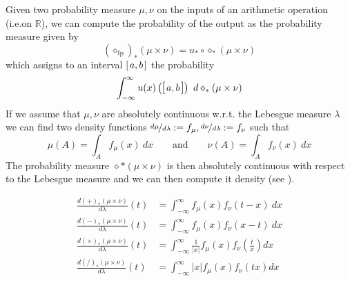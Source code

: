 \documentclass[10pt,a4paper]{article}
\newcommand{\R}{\mathbb{R}}
\newcommand{\intvl}[1]{\mathlarger{\left[\right.}  #1 \mathlarger{\left.\right]}}
\newcommand{\fp}{_{\mathrm{fp}}}
\newcommand{\absv}[1]{\vert #1\vert}
\begin{document}
Given two probability measure $\mu,\nu$ on the inputs of an arithmetic operation (i.e.\@ on $\R$), we can compute the probability of the output as the probability measure given by
\[
(\diamond\fp)_\ast(\mu\times\nu)=u_\ast\circ \diamond_\ast (\mu\times \nu)
\]
which assigns to an interval $\intvl{a,b}$ the probability
\begin{equation}\label{eq:noisyoperation}
\int_{-\infty}^{\infty} u(x)\left(\intvl{a,b}\right) ~d\diamond_\ast(\mu\times \nu)
\end{equation}
If we assume that $\mu,\nu$ are absolutely continuous w.r.t. the Lebesgue measure $\lambda$ we can find two density functions $\nicefrac{d\mu}{d\lambda}:=f_\mu,\nicefrac{d\nu}{d\lambda}:=f_\nu$ such that
\[
\mu(A)=\int_A f_\mu(x)~dx\qquad\text{and}\qquad\nu(A)=\int_A f_\nu(x)~dx
\]
The probability measure $\diamond\ast(\mu\times \nu)$ is then absolutely continuous with respect to the Lebesgue measure and we can then compute it density (see \cite{springer1979algebra}).

\begin{align*}
\frac{d(+)_\ast(\mu\times\nu)}{d\lambda}(t)&=\int_{-\infty}^{\infty} f_\mu(x)f_\nu(t-x)~dx\\
\frac{d(-)_\ast(\mu\times\nu)}{d\lambda}(t)&=\int_{-\infty}^{\infty} f_\mu(x)f_\nu(x-t)~dx\\
\frac{d(\times)_\ast(\mu\times\nu)}{d\lambda}(t)&=\int_{-\infty}^{\infty} \frac{1}{\absv{x}}f_\mu(x)f_\nu\left(\frac{t}{x}\right)dx\\
\frac{d(/)_\ast(\mu\times\nu)}{d\lambda}(t)&=\int_{-\infty}^{\infty} \absv{x}f_\mu(x)f_\nu(tx)dx
\end{align*}
\end{document}
